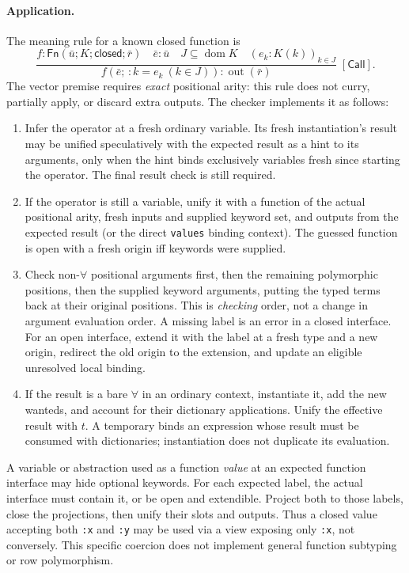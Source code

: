 \documentclass[11pt]{article}
\theoremstyle{definition}
\newcommand{\code}[1]{\texttt{#1}}
\newcommand{\dom}{\operatorname{dom}}
\newcommand{\pack}{\operatorname{out}}
\newcommand{\Fn}{\mathsf{Fn}}
\newcommand{\rrule}[3]{\frac{\displaystyle #2}{\displaystyle #3}
                       \;{\scriptstyle[\textsf{#1}]}}
\begin{document}
\paragraph{Application.}
The meaning rule for a known closed function is
\[
 \rrule{Call}{f:\Fn(\bar u;K;\mathsf{closed};\bar r)
        \quad \bar e:\bar u \quad J\subseteq\dom K
        \quad(e_k:K(k))_{k\in J}}
       {f(\bar e;\,{:}k=e_k\ (k\in J)):\pack(\bar r)} .
\]
The vector premise requires \emph{exact} positional arity: this rule
does not curry, partially apply, or discard extra outputs. The checker
implements it as follows:
\begin{enumerate}
\item Infer the operator at a fresh ordinary variable. Its fresh
instantiation's result may be unified speculatively with the expected result
as a hint to its arguments, only when the hint binds exclusively variables
fresh since starting the operator. The final result check is still required.
\item If the operator is still a variable, unify it with a function of the
actual positional arity, fresh inputs and supplied keyword set, and outputs
from the expected result (or the direct \code{values} binding context).
The guessed function is open with a fresh origin iff keywords were supplied.
\item Check non-$\forall$ positional arguments first, then the remaining
polymorphic positions, then the supplied keyword arguments, putting the
typed terms back at their original positions. This is \emph{checking}
order, not a change in argument evaluation order. A missing label is an
error in a closed interface. For an open interface, extend it with the
label at a fresh type and a new origin, redirect the old origin to the
extension, and update an eligible unresolved local binding.
\item If the result is a bare $\forall$ in an ordinary context, instantiate
it, add the new wanteds, and account for their dictionary applications.
Unify the effective result with $t$. A temporary binds an expression whose
result must be consumed with dictionaries; instantiation does not duplicate
its evaluation.
\end{enumerate}
A variable or abstraction used as a function \emph{value} at an expected
function interface may hide optional keywords. For each expected label,
the actual interface must contain it, or be open and extendible. Project
both to those labels, close the projections, then unify their slots and
outputs. Thus a closed value accepting both \code{:x} and \code{:y} may be
used via a view exposing only \code{:x}, not conversely. This specific
coercion does not implement general function subtyping or row polymorphism.
\end{document}

